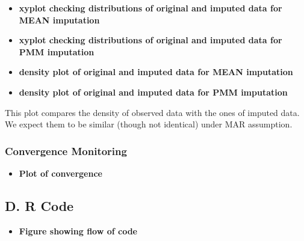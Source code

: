 \documentclass[12pt,]{article}
\providecommand{\tightlist}{%
  \setlength{\itemsep}{0pt}\setlength{\parskip}{0pt}}
\begin{document}
\begin{itemize}
\item
  \textbf{xyplot checking distributions of original and imputed data for
  MEAN imputation}
\item
  \textbf{xyplot checking distributions of original and imputed data for
  PMM imputation}
\item
  \textbf{density plot of original and imputed data for MEAN imputation}
\item
  \textbf{density plot of original and imputed data for PMM imputation}
\end{itemize}

This plot compares the density of observed data with the ones of imputed
data. We expect them to be similar (though not identical) under MAR
assumption.

\subsubsection{Convergence Monitoring}\label{convergence-monitoring}

\begin{itemize}
\tightlist
\item
  \textbf{Plot of convergence}
\end{itemize}

\subsection{D. R Code}\label{d.-r-code}

\begin{itemize}
\tightlist
\item
  \textbf{Figure showing flow of code}
\end{itemize}

\newpage


\end{document}
